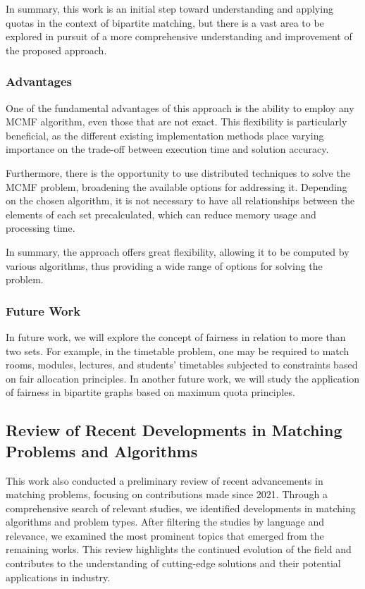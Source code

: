         In summary, this work is an initial step toward understanding and applying quotas in the context of bipartite matching, but there is a vast area to be explored in pursuit of a more comprehensive understanding and improvement of the proposed approach.
        
        \subsubsection{Advantages}
        
        One of the fundamental advantages of this approach is the ability to employ any MCMF algorithm, even those that are not exact. This flexibility is particularly beneficial, as the different existing implementation methods place varying importance on the trade-off between execution time and solution accuracy.
        
        Furthermore, there is the opportunity to use distributed techniques to solve the MCMF problem, broadening the available options for addressing it.
        Depending on the chosen algorithm, it is not necessary to have all relationships between the elements of each set precalculated, which can reduce memory usage and processing time.
        
        In summary, the approach offers great flexibility, allowing it to be computed by various algorithms, thus providing a wide range of options for solving the problem.
        
        \subsubsection{Future Work}
        
        In future work, we will explore the concept of fairness in relation to more than two sets. 
        For example, in the timetable problem, one may be required to match rooms, modules, lectures, and students' timetables subjected to constraints based on fair allocation principles.
        In another future work, we will study the application of fairness in bipartite graphs based on maximum quota principles.


\subsection{Review of Recent Developments in Matching Problems and Algorithms}

    This work also conducted a preliminary review of recent advancements in matching problems, focusing on contributions made since 2021. Through a comprehensive search of relevant studies, we identified developments in matching algorithms and problem types. After filtering the studies by language and relevance, we examined the most prominent topics that emerged from the remaining works. This review highlights the continued evolution of the field and contributes to the understanding of cutting-edge solutions and their potential applications in industry.


